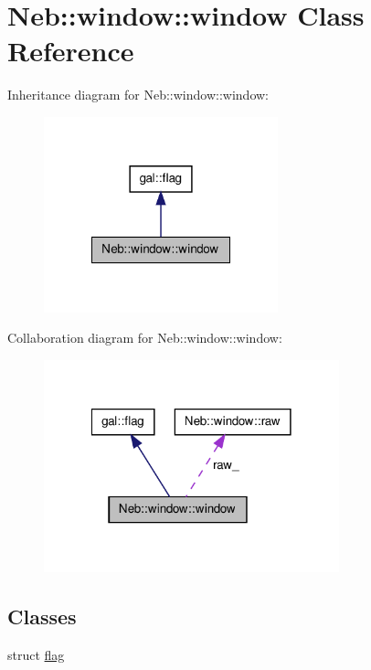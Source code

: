 \hypertarget{classNeb_1_1window_1_1window}{\section{\-Neb\-:\-:window\-:\-:window \-Class \-Reference}
\label{classNeb_1_1window_1_1window}
}


\-Inheritance diagram for \-Neb\-:\-:window\-:\-:window\-:\nopagebreak
\begin{figure}[H]
\begin{center}
\leavevmode
\includegraphics[width=192pt]{classNeb_1_1window_1_1window__inherit__graph}
\end{center}
\end{figure}


\-Collaboration diagram for \-Neb\-:\-:window\-:\-:window\-:\nopagebreak
\begin{figure}[H]
\begin{center}
\leavevmode
\includegraphics[width=242pt]{classNeb_1_1window_1_1window__coll__graph}
\end{center}
\end{figure}
\subsection*{\-Classes}
\begin{DoxyCompactItemize}
\item 
struct \hyperlink{structNeb_1_1window_1_1window_1_1flag}{flag}
\end{DoxyCompactItemize}
